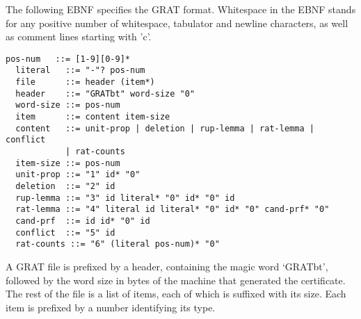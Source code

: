 \documentclass{llncs}
\begin{document}
The following EBNF specifies the GRAT format. Whitespace in the EBNF stands for any positive number of 
whitespace, tabulator and newline characters, as well as comment lines starting with 'c'.
\begin{lstlisting}[language={},columns={[c]fullflexible},literate={}]
  pos-num   ::= [1-9][0-9]*
  literal   ::= "-"? pos-num
  file      ::= header (item*)
  header    ::= "GRATbt" word-size "0"
  word-size ::= pos-num
  item      ::= content item-size
  content   ::= unit-prop | deletion | rup-lemma | rat-lemma | conflict 
            | rat-counts
  item-size ::= pos-num
  unit-prop ::= "1" id* "0"
  deletion  ::= "2" id
  rup-lemma ::= "3" id literal* "0" id* "0" id
  rat-lemma ::= "4" literal id literal* "0" id* "0" cand-prf* "0"
  cand-prf  ::= id id* "0" id
  conflict  ::= "5" id
  rat-counts ::= "6" (literal pos-num)* "0"
\end{lstlisting}
A GRAT file is prefixed by a header, containing the magic word `GRATbt', followed by the word size in bytes of the machine that generated the certificate. 
The rest of the file is a list of items, each of which is suffixed with its size.
Each item is prefixed by a number identifying its type. 
\end{document}
